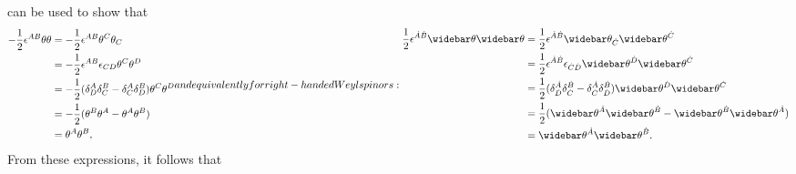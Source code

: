  can be used to show that
\begin{subequations}
\begin{align}
    -\frac{1}{2}\epsilon^{AB}\thetatwo &= -\frac{1}{2}\epsilon^{AB}\theta^C\theta_C
    \nonumber \\
    &= -\frac{1}{2}\epsilon^{AB}\epsilon_{CD}\theta^C\theta^D
    \nonumber \\
    &= -\frac{1}{2}(\delta^A_D\delta^B_C - \delta^A_C\delta^B_D)\theta^C\theta^D
    \nonumber \\
    &= -\frac{1}{2}(\theta^B\theta^A - \theta^A\theta^B)
    \nonumber \\
    &= \theta^A\theta^B,
\end{align}
and equivalently for right-handed Weyl spinors:
\begin{align}
    \frac{1}{2}\epsilon^{\dot{A}\dot{B}}\thetabartwo &= \frac{1}{2}\epsilon^{\dot{A}\dot{B}}\thetabar_{\dot{C}}\thetabar^{\dot{C}}
    \nonumber \\
    &= \frac{1}{2}\epsilon^{\dot{A}\dot{B}}\epsilon_{\dot{C}\dot{D}}\thetabar^{\dot{D}}\thetabar^{\dot{C}}
    \nonumber \\
    &= \frac{1}{2}(\delta^{\dot{A}}_{\dot{D}}\delta^{\dot{B}}_{\dot{C}} - \delta^{\dot{A}}_{\dot{C}}\delta^{\dot{B}}_{\dot{D}})\thetabar^{\dot{D}}\thetabar^{\dot{C}}
    \nonumber \\
    &= \frac{1}{2}(\thetabar^{\dot{A}}\thetabar^{\dot{B}} - \thetabar^{\dot{B}}\thetabar^{\dot{A}})
    \nonumber \\
    &= \thetabar^{\dot{A}}\thetabar^{\dot{B}}.
\end{align}
\end{subequations}
From these expressions, it follows that
